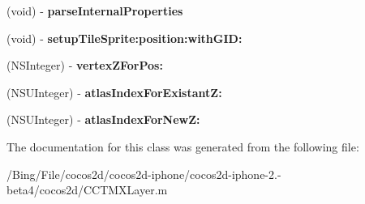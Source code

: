 \begin{DoxyCompactItemize}
\item 
\hypertarget{interface_c_c_t_m_x_layer_07_08_a96c28602526d168da480320aba3ec603}{(void) -\/ {\bfseries parse\-Internal\-Properties}}\label{interface_c_c_t_m_x_layer_07_08_a96c28602526d168da480320aba3ec603}

\item 
\hypertarget{interface_c_c_t_m_x_layer_07_08_a2db3dacd68391dd66ad9da1196d471e7}{(void) -\/ {\bfseries setup\-Tile\-Sprite\-:position\-:with\-G\-I\-D\-:}}\label{interface_c_c_t_m_x_layer_07_08_a2db3dacd68391dd66ad9da1196d471e7}

\item 
\hypertarget{interface_c_c_t_m_x_layer_07_08_add1627acd2215a6c7cb6b3e14f545cc2}{(N\-S\-Integer) -\/ {\bfseries vertex\-Z\-For\-Pos\-:}}\label{interface_c_c_t_m_x_layer_07_08_add1627acd2215a6c7cb6b3e14f545cc2}

\item 
\hypertarget{interface_c_c_t_m_x_layer_07_08_af23bc49297facc5d932c6d6ff185db42}{(N\-S\-U\-Integer) -\/ {\bfseries atlas\-Index\-For\-Existant\-Z\-:}}\label{interface_c_c_t_m_x_layer_07_08_af23bc49297facc5d932c6d6ff185db42}

\item 
\hypertarget{interface_c_c_t_m_x_layer_07_08_a669bb03d9681e6b4cb3f4b2cf7aec196}{(N\-S\-U\-Integer) -\/ {\bfseries atlas\-Index\-For\-New\-Z\-:}}\label{interface_c_c_t_m_x_layer_07_08_a669bb03d9681e6b4cb3f4b2cf7aec196}

\end{DoxyCompactItemize}


The documentation for this class was generated from the following file\-:\begin{DoxyCompactItemize}
\item 
/\-Bing/\-File/cocos2d/cocos2d-\/iphone/cocos2d-\/iphone-\/2.-\/beta4/cocos2d/C\-C\-T\-M\-X\-Layer.\-m\end{DoxyCompactItemize}
